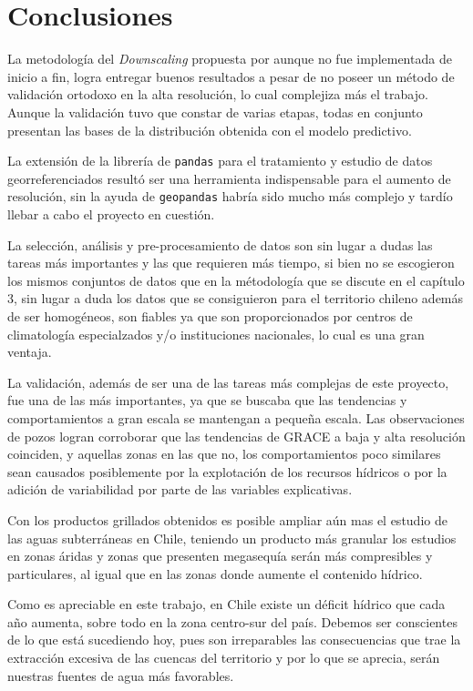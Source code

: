 \chapter{Conclusiones}
\label{C6}

La metodología del \textit{Downscaling} propuesta por \cite{11} aunque no fue implementada de inicio a fin, logra entregar buenos resultados a pesar de no poseer un método de validación ortodoxo en la alta resolución, lo cual
complejiza más el trabajo. Aunque la validación tuvo que constar de varias etapas, todas en conjunto presentan las bases de la distribución obtenida con el modelo predictivo.

La extensión de la librería de \texttt{pandas} para el tratamiento y estudio de datos georreferenciados resultó ser una herramienta indispensable para el aumento de resolución, sin la ayuda de \texttt{geopandas} habría sido
mucho más complejo y tardío llebar a cabo el proyecto en cuestión.

La selección, análisis y pre-procesamiento de datos son sin lugar a dudas las tareas más importantes y las que requieren más tiempo, si bien no se escogieron los mismos conjuntos de datos que en la métodología que se discute 
en el capítulo 3, sin lugar a duda los datos que se consiguieron para el territorio chileno además de ser homogéneos, son fiables ya que son proporcionados por centros de climatología especialzados y/o instituciones nacionales, lo cual
es una gran ventaja.

La validación, además de ser una de las tareas más complejas de este proyecto, fue una de las más importantes, ya que se buscaba que las tendencias y comportamientos a gran escala se mantengan a pequeña escala. Las observaciones de pozos
logran corroborar que las tendencias de GRACE a baja y alta resolución coinciden, y aquellas zonas en las que no, los comportamientos poco similares sean causados posiblemente por la explotación de los recursos hídricos o por la adición de variabilidad por parte de las
variables explicativas.

Con los productos grillados obtenidos es posible ampliar aún mas el estudio de las aguas subterráneas en Chile, teniendo un producto más granular los estudios en zonas áridas y zonas que presenten megasequía serán 
más compresibles y particulares, al igual que en las zonas donde aumente el contenido hídrico.

Como es apreciable en este trabajo, en Chile existe un déficit hídrico que cada año aumenta, sobre todo en la zona centro-sur del país. Debemos ser conscientes de lo que está sucediendo hoy, pues son irreparables las consecuencias que trae
la extracción excesiva de las cuencas del territorio y por lo que se aprecia, serán nuestras fuentes de agua más favorables.